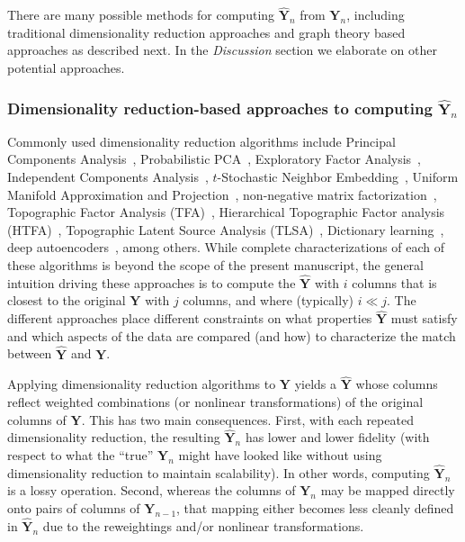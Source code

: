 \documentclass[english]{article}
\begin{document}
There are many possible methods for computing $\hat{\mathbf{Y}}_n$
from $\mathbf{Y}_n$, including traditional dimensionality reduction
approaches and graph theory based approaches as described next.  In the
\textit{Discussion} section we elaborate on other potential approaches.

\subsubsection*{Dimensionality reduction-based approaches to computing
  $\hat{\mathbf{Y}}_n$}

Commonly used dimensionality reduction algorithms include Principal
Components Analysis~\citep[PCA; ][]{Pear01}, Probabilistic
PCA~\citep[PPCA; ][]{TippBish99}, Exploratory Factor
Analysis~\citep[EFA; ][]{Spea04}, Independent Components
Analysis~\citep[ICA; ][]{JuttHera91, ComoEtal91}, $t$-Stochastic
Neighbor Embedding~\citep[$t$-SNE; ][]{MaatHint08}, Uniform Manifold
Approximation and Projection~\citep[UMAP; ][]{McInHeal18},
non-negative matrix factorization~\citep[NMF; ][]{LeeSeun99},
Topographic Factor Analysis (TFA)~\cite{MannEtal14b}, Hierarchical
Topographic Factor analysis (HTFA)~\cite{MannEtal18}, Topographic
Latent Source Analysis (TLSA)~\cite{GersEtal11}, Dictionary
learning~\citep{MairEtal09a, MairEtal09b}, deep
autoencoders~\citep{HintSala06}, among others.  While complete
characterizations of each of these algorithms is beyond the scope of
the present manuscript, the general intuition driving these
approaches is to compute the $\hat{\mathbf{Y}}$ with $i$ columns that
is closest to the original $\mathbf{Y}$ with $j$ columns, and where
(typically) $i \ll j$.  The different approaches place different
constraints on what properties $\hat{\mathbf{Y}}$ must satisfy and
which aspects of the data are compared (and how) to characterize the
match between $\hat{\mathbf{Y}}$ and  $\mathbf{Y}$.

Applying dimensionality reduction algorithms to $\mathbf{Y}$ yields a
$\hat{\mathbf{Y}}$ whose columns reflect weighted combinations (or
nonlinear transformations) of the original columns of $\mathbf{Y}$.
This has two main consequences.  First, with each repeated
dimensionality reduction, the resulting $\hat{\mathbf{Y}}_n$ has lower
and lower fidelity (with respect to what the ``true'' $\mathbf{Y}_n$
might have looked like without using dimensionality reduction to
maintain scalability).  In other words, computing $\hat{\mathbf{Y}}_n$
is a lossy operation.  Second, whereas the columns of $\mathbf{Y}_n$
may be mapped directly onto pairs of columns of $\mathbf{Y}_{n-1}$,
that mapping either becomes less cleanly defined in
$\hat{\mathbf{Y}}_n$ due to the reweightings and/or nonlinear
transformations.
\end{document}
